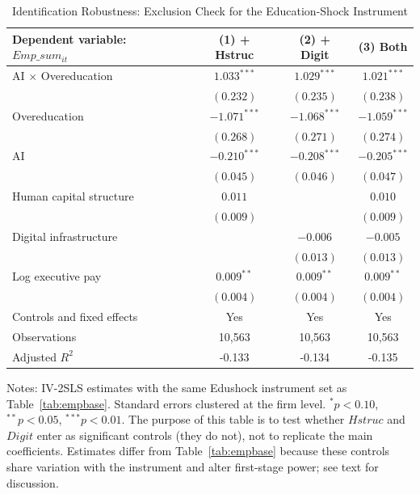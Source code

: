 \documentclass[12pt,a4paper]{article}
\theoremstyle{predstyle}
\theoremstyle{plain}
\begin{document}
\begin{table}[H]
\centering
\caption{Identification Robustness: Exclusion Check for the Education-Shock Instrument}
\label{tab:eduexclusion}
\begin{threeparttable}
\scriptsize
\setlength{\tabcolsep}{4pt}
\begin{tabular}{lccc}
\toprule
Dependent variable: \(Emp\_sum_{it}\) & (1) + Hstruc & (2) + Digit & (3) Both \\
\midrule
AI \(\times\) Overeducation & \(1.033^{***}\) & \(1.029^{***}\) & \(1.021^{***}\) \\
 & \((0.232)\) & \((0.235)\) & \((0.238)\) \\
Overeducation & \(-1.071^{***}\) & \(-1.068^{***}\) & \(-1.059^{***}\) \\
 & \((0.268)\) & \((0.271)\) & \((0.274)\) \\
AI & \(-0.210^{***}\) & \(-0.208^{***}\) & \(-0.205^{***}\) \\
 & \((0.045)\) & \((0.046)\) & \((0.047)\) \\
Human capital structure & \(0.011\) & & \(0.010\) \\
 & \((0.009)\) & & \((0.009)\) \\
Digital infrastructure & & \(-0.006\) & \(-0.005\) \\
 & & \((0.013)\) & \((0.013)\) \\
Log executive pay & \(0.009^{**}\) & \(0.009^{**}\) & \(0.009^{**}\) \\
 & \((0.004)\) & \((0.004)\) & \((0.004)\) \\
Controls and fixed effects & Yes & Yes & Yes \\
\midrule
Observations & 10,563 & 10,563 & 10,563 \\
Adjusted \(R^2\) & -0.133 & -0.134 & -0.135 \\
\bottomrule
\end{tabular}
\begin{tablenotes}
\footnotesize
\item Notes: IV-2SLS estimates with the same Edushock instrument set as Table~\ref{tab:empbase}. Standard errors clustered at the firm level. \(^{*}p<0.10\), \(^{**}p<0.05\), \(^{***}p<0.01\). The purpose of this table is to test whether \(Hstruc\) and \(Digit\) enter as significant controls (they do not), not to replicate the main coefficients. Estimates differ from Table~\ref{tab:empbase} because these controls share variation with the instrument and alter first-stage power; see text for discussion.
\end{tablenotes}
\end{threeparttable}
\end{table}
\end{document}
